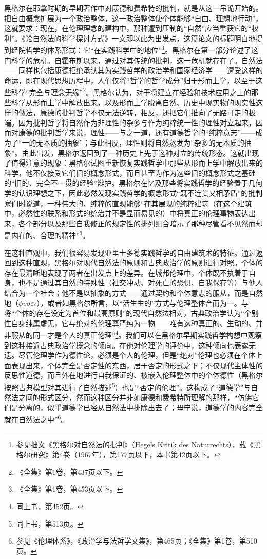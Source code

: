 黑格尔在耶拿时期的早期著作中对康德和费希特的批判，就是从这一吊诡开始的。把自由概念扩展为一个政治整体，这一政治整体使个体能够“自由、理想地行动”，这就要求：现在，在伦理理念的建构中，那种遭到压制的“自然”应当重获它的“权利”。《论自然法的科学探讨方式》一文即以此为出发点，这篇论文的标题明白地提到经院哲学的体系形式：它“在实践科学中的地位”\footnote{参见拙文《黑格尔对自然法的批判》（Hegels Kritik des Naturrechts），载《黑格尔研究》第4卷（1967年），第177页以下，本书第42页以下。}。黑格尔在第一部分论述了这门科学的危机。自霍布斯以来，通过对其传统的批判，这一危机就存在了。自然法——同样也包括康德拒绝承认其为实践哲学的政治学和国家经济学——遭受这样的命运，即在现代思想历程中，人们仅将“哲学的哲学成分”归于形而上学，以至于这些科学“完全与理念无缘”\footnote{《全集》第1卷，第437页以下。}。黑格尔认为，对于将建立在经验和技术应用之上的那些科学从形而上学中解放出来，以及形而上学脱离自然、历史中现实物的现实性这样的做法，康德的批判哲学不仅无法逆转，相反，还把它们推向了无路可走的极端。因为批判哲学将自然作为非理性的杂多与作为纯粹统一性的理性对立起来，因而对康德的批判哲学来说，理性——与之一道，还有道德哲学的“纯粹意志”——成为了“一的无本质的抽象”；与此相反，理性则将自然蒸发为“杂多的无本质的抽象”。由此出发，黑格尔返回到了一种历史上先于这种对立的传统形态。这就出现了值得注意的现象：黑格尔试图重新恢复实践哲学中那些从形而上学中解放出来的科学，他不仅接受它们旧的概念形式，而且甚至为作为这些旧的概念形式之基础的“旧的、完全不一贯的经验”辩护。黑格尔在忆及那些将实践哲学的经验置于几何学的认识理想之下，因此必然发现实践哲学的概念形式“既不连贯又相矛盾”的批判家们时说道，一种伟大的、纯粹的直观能够“在其展现的纯粹建筑（在这个建筑中，必然性的联系和形式的统治并不是显而易见的）中将真正的伦理事物表达出来，各个部分以及那些自我修正的规定性的排列组合暗示了那种尽管看不见然而却是内在的、合理的精神”\footnote{《全集》第1卷，第453页以下。}。

在这种直观中，我们很容易发现亚里士多德实践哲学的自由建筑术的特征。通过返回到这种直观，黑格尔对现代自然法的原则和古典政治学的原则进行对照。个体的存在最清晰地表现了两者在出发点上的差异。在城邦伦理中，个体既不执着于自身，也不是通过其自然的特殊性（社交冲动、对死亡的恐惧、自我保存等）与他人结合为一个社会；他不是以抽象的方式——通过契约和个体意志的服从，而是自然地（$\phi\acute{\upsilon}\sigma\varepsilon\iota$），或者如黑格尔所言，以“活生生的”方式与伦理整体合而为一。与将“个体的存在设定为首位和最高原则”的现代自然法相对，古典政治学认为“个别性自身纯属虚无，它与绝对的伦理尊严纯为一物——唯有这种真正的、生动的、并非服从的同一才是个人的真正伦理”\footnote{同上书，第452页。}。我们可以在黑格尔早期实践哲学构想中观察到这种接近古典政治学概念的倾向。在他对伦理学的评价中，这种倾向也表露无遗。尽管伦理学作为德性论，必须是个人的伦理，但是“绝对”伦理也必须在个体上面表现出来，个体完全是否定性的东西，居于否定的形式之下；不仅现代主体性的反思性道德，而且外在地进行自我保证的、被嵌入伦理整体中的个体德性（黑格尔按照古典模型对其进行了自然描述\footnote{同上书，第513页。}）也是“否定的伦理”。这构成了“道德学”与自然法之间的形式区分，然而这种区分并非如康德和费希特所理解的那样，“仿佛它们是分离的，似乎道德学已经从自然法中排除出去了；毋宁说，道德学的内容完全就在自然法之中”\footnote{参见《伦理体系》，《政治学与法哲学文集》，第465页；《全集》第1卷，第510页。}。

